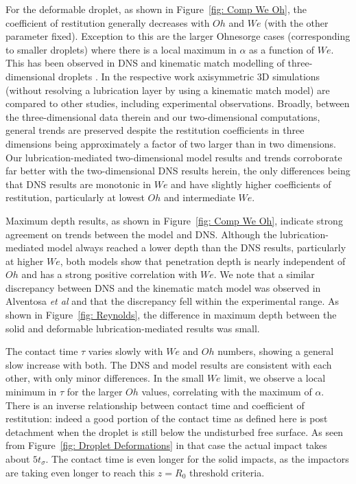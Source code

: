For the  deformable droplet, as shown in Figure~\ref{fig: Comp We Oh}, the coefficient of restitution generally decreases with $Oh$ and $W\!e$ (with the other parameter fixed). Exception to this are the larger Ohnesorge cases (corresponding to smaller droplets) where there is a local maximum in $\alpha$ as a function of $W\!e$. This has been observed in DNS and kinematic match modelling of three-dimensional droplets \cite{alventosa2023inertio}. In the respective work  axisymmetric 3D simulations (without resolving a lubrication layer by using a kinematic match model) are compared to other studies, including experimental observations. Broadly, between the three-dimensional data therein and our two-dimensional computations, general trends are preserved despite the restitution coefficients in three dimensions being approximately a factor of two larger than in two dimensions. Our lubrication-mediated two-dimensional model results and trends corroborate far better with the two-dimensional DNS results herein, the only differences being that DNS results are monotonic in $W\!e$ and have slightly higher coefficients of restitution, particularly at lowest $Oh$ and intermediate $W\!e$. 

 Maximum depth results, as shown in Figure~\ref{fig: Comp We Oh}, indicate strong agreement on trends between the model and DNS. Although the lubrication-mediated model always reached a lower depth than the DNS results, particularly at higher $W\!e$, both models show that penetration depth is nearly independent of $Oh$ and has a strong positive correlation with $W\!e$. We note that a similar discrepancy between DNS and the kinematic match model was observed in Alventosa \textit{et al} \cite{alventosa2023inertio} and that the discrepancy fell within the experimental range. As shown in Figure~\ref{fig: Reynolds}, the difference in maximum depth between the solid and deformable lubrication-mediated results was small.

The contact time $\tau$ varies slowly with $W\!e$ and $Oh$ numbers, showing a general slow increase with both. The DNS and model results are consistent with each other, with only minor differences. In the small $W\!e$ limit, we observe a local minimum in $\tau$ for the larger $Oh$ values, correlating with the maximum of $\alpha$. There is an inverse relationship between contact time and coefficient of restitution: indeed a good portion of the contact time as defined here is post detachment when the droplet is still below the undisturbed free surface. As seen from Figure~\ref{fig: Droplet Deformations} in that case the actual impact takes about $5 t_\sigma$. The contact time is even longer for the solid impacts, as the impactors are taking even longer to reach this $z=R_0$ threshold criteria. 

